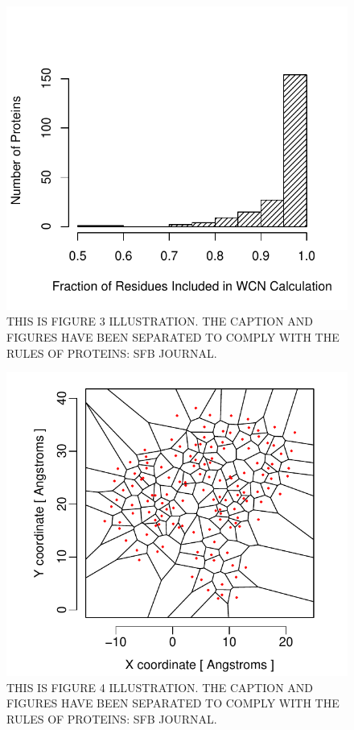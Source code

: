 \documentclass[12pt]{article}
\begin{document}
    \begin{figure}
        \begin{center}
        \includegraphics[width=6in]{WCN_fraction_of_residues_included.pdf}
        \end{center}
        \caption{THIS IS FIGURE 3 ILLUSTRATION. THE CAPTION AND FIGURES HAVE BEEN SEPARATED TO COMPLY WITH THE RULES OF PROTEINS: SFB JOURNAL.}
        \label{fig:wcn_pwrl_cutoff}
    \end{figure}
    
    \begin{figure}
        \begin{center}
        \includegraphics[width=6in]{voronoi_diagram.pdf}
        \end{center}
        \caption{THIS IS FIGURE 4 ILLUSTRATION. THE CAPTION AND FIGURES HAVE BEEN SEPARATED TO COMPLY WITH THE RULES OF PROTEINS: SFB JOURNAL.}
        \label{fig:voronoi}
    \end{figure}
\end{document}
